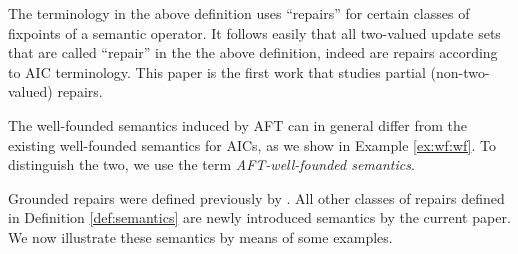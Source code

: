 The terminology in the above definition uses ``repairs'' for certain classes of fixpoints of a semantic operator. It follows easily that  all two-valued update sets that are called ``repair'' in the the above definition, indeed are repairs according to AIC terminology. 
This paper is the first work that studies partial (non-two-valued) repairs. 
 

The well-founded semantics induced by AFT can in general differ from the existing well-founded semantics for AICs, as we show in Example \ref{ex:wf:wf}. To distinguish the two, we use the term \emph{AFT-well-founded semantics}. %

Grounded repairs were defined previously by \citet{iclp/Cruz-Filipe16}. All other classes of repairs defined in Definition \ref{def:semantics} are newly introduced semantics by the current paper. 
We now illustrate these semantics by means of some examples. 

